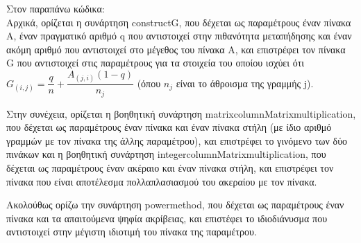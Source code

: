 \documentclass[a4paper,11pt]{article}
\newcommand{\lt}{\latintext}
\begin{document}
Στον παραπάνω κώδικα:\\
Αρχικά, ορίζεται η συνάρτηση {\lt construct\textunderscore G}, που δέχεται ως παραμέτρους έναν πίνακα Α, έναν πραγματικό αριθμό {\lt q} που αντιστοιχεί στην πιθανότητα μεταπήδησης και έναν ακόμη αριθμό που αντιστοιχεί στο μέγεθος του πίνακα Α, και επιστρέφει τον πίνακα {\lt G} που αντιστοιχεί στις παραμέτρους για τα στοιχεία του οποίου ισχύει ότι {\lt $G_{(i,j)} = \dfrac{q}{n}+\dfrac{A_{(j,i)}(1-q)}{n_j}$} (όπου {\lt $n_j$} είναι το άθροισμα της γραμμής {\lt j}).\\
\par
Στην συνέχεια, ορίζεται η βοηθητική συνάρτηση {\lt matrix\textunderscore columnMatrix\textunderscore multiplication}, που δέχεται ως παραμέτρους έναν πίνακα και έναν πίνακα στήλη (με ίδιο αριθμό γραμμών με τον πίνακα της άλλης παραμέτρου), και επιστρέφει το γινόμενο των δύο πινάκων και η βοηθητική συνάρτηση {\lt integer\textunderscore columnMatrix\textunderscore multiplication}, που δέχεται ως παραμέτρους έναν ακέραιο και έναν πίνακα στήλη, και επιστρέφει τον πίνακα που είναι αποτέλεσμα πολλαπλασιασμού του ακεραίου με τον πίνακα.\\
\par
Ακολούθως ορίζω την συνάρτηση {\lt power\textunderscore method}, που δέχεται ως παραμέτρους έναν πίνακα και τα απαιτούμενα ψηφία ακρίβειας, και επιστέφει το ιδιοδιάνυσμα που αντιστοιχεί στην μέγιστη ιδιοτιμή του πίνακα της παραμέτρου.
\end{document}
